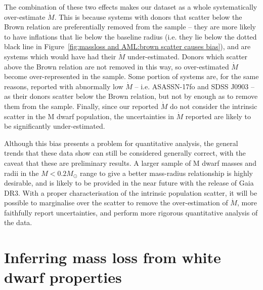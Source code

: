 The combination of these two effects makes our dataset as a whole systematically over-estimate $\dot M$. This is because systems with donors that scatter below the Brown relation are preferentially removed from the sample -- they are more likely to have inflations that lie below the baseline radius (i.e. they lie below the dotted black line in Figure~\ref{fig:massloss and AML:brown scatter causes bias}), and are systems which would have had their $\dot M$ under-estimated.
Donors which scatter above the Brown relation are not removed in this way, so over-estimated $\dot M$ become over-represented in the sample.
Some portion of systems are, for the same reasons, reported with abnormally low $\dot M$ -- i.e. ASASSN-17fo and SDSS J0903 -- as their donors scatter below the Brown relation, but not by enough as to remove them from the sample.
Finally, since our reported $\dot M$ do not consider the intrinsic scatter in the M dwarf population, the uncertainties in $\dot M$ reported are likely to be significantly under-estimated.

Although this bias presents a problem for quantitative analysis, the general trends that these data show can still be considered generally correct, with the caveat that these are preliminary results. A larger sample of M dwarf masses and radii in the $M < 0.2 M_\odot$ range to give a better mass-radius relationship is highly desirable, and is likely to be provided in the near future with the release of Gaia DR3.
With a proper characterisation of the intrinsic population scatter, it will be possible to marginalise over the scatter to remove the over-estimation of $\dot M$, more faithfully report uncertainties, and perform more rigorous quantitative analysis of the data.



\section{Inferring mass loss from white dwarf properties}
\label{sect:modelling:white dwarf mass loss rates}



